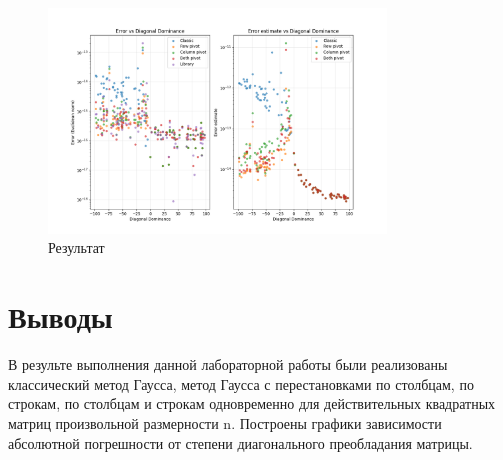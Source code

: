 \documentclass[a4paper, 14pt]{extarticle}
\begin{document}
\begin{figure}[!htb]
	\centering
	\includegraphics[width=0.8\textwidth]{img4}
\caption{Результат}
\label{fig:img4}
\end{figure}

\clearpage
\section{Выводы}\label{Sect::fin}

В результе выполнения данной лабораторной работы были реализованы классический
метод Гаусса, метод Гаусса с перестановками по столбцам, по строкам, по столбцам
и строкам одновременно для действительных квадратных матриц произвольной
размерности n. Построены графики зависимости абсолютной погрешности от степени
диагонального преобладания матрицы.
\end{document}
